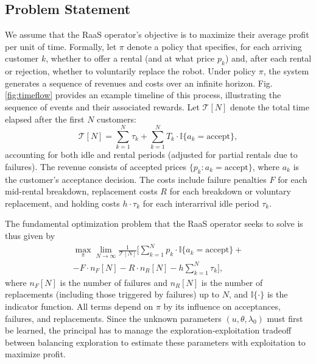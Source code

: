 \documentclass[conference]{IEEEtran}
\begin{document}

\subsection{Problem Statement}
We assume that the RaaS operator's objective is to maximize their average profit per unit of time. Formally, let $\pi$ denote a policy that specifies, for each arriving customer $k$, whether to offer a rental (and at what price $p_k$) and, after each rental or rejection, whether to voluntarily replace the robot. Under policy $\pi$, the system generates a sequence of revenues and costs over an infinite horizon. Fig. \ref{fig:timeflow} provides an example timeline of this process, illustrating the sequence of events and their associated rewards.  Let $\mathcal{T}[N]$ denote the total time elapsed after the first $N$ customers:
\begin{equation}
\mathcal{T}[N] = \sum_{k=1}^N \tau_k + \sum_{k=1}^N T_k \cdot \mathbb{I}\{a_k = \text{accept}\},
\end{equation}
accounting for both idle and rental periods (adjusted for partial rentals due to failures). The revenue consists of accepted prices $\{p_k : a_k = \text{accept}\}$, where $a_k$ is the customer's acceptance decision. The costs include failure penalties $F$ for each mid-rental breakdown, replacement costs $R$ for each breakdown or voluntary replacement, and holding costs $h \cdot \tau_k$ for each interarrival idle period $\tau_k$.


The fundamental optimization problem that the RaaS operator seeks to solve is thus given by
\begin{multline}
\label{eqn:raasobj}
    \max_{\pi} \lim_{N \to \infty} \frac{1}{\mathcal{T}[N]} \Bigg[ \sum_{k=1}^N p_k \cdot \mathbb{I}\{a_k = \text{accept}\} +\\
    - F \cdot n_F[N] - R \cdot n_R[N] - h \sum_{k=1}^N \tau_k \Bigg],
\end{multline}
where $n_F[N]$ is the number of failures and $n_R[N]$ is the number of replacements (including those triggered by failures) up to $N$, and $\mathbb{I}\{\cdot\}$ is the indicator function. All terms depend on $\pi$ by its influence on acceptances, failures, and replacements. Since the unknown parameters $(u, \theta, \lambda_0)$ must first be learned, the principal has to manage the exploration-exploitation tradeoff between balancing exploration to estimate these parameters with exploitation to maximize profit. 
\end{document}
